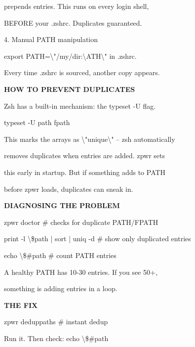 \documentclass[11pt,a4paper,twoside]{book}
\begin{document}
prepends entries. This runs on every login shell,

BEFORE your .zshrc. Duplicates guaranteed.

4. Manual PATH manipulation

export PATH=\textbackslash{}"/my/dir:\textbackslash{}ATH\textbackslash{}" in .zshrc.

Every time .zshrc is sourced, another copy appears.


\vspace{12pt}
{\bfseries\color{neonyellow} HOW TO PREVENT DUPLICATES}\vspace{4pt}

Zsh has a built-in mechanism: the typeset -U flag.

typeset -U path fpath

This marks the arrays as \textbackslash{}"unique\textbackslash{}" -- zsh automatically

removes duplicates when entries are added. zpwr sets

this early in startup. But if something adds to PATH

before zpwr loads, duplicates can sneak in.


\vspace{12pt}
{\bfseries\color{neonyellow} DIAGNOSING THE PROBLEM}\vspace{4pt}

\begin{codebox}
zpwr doctor                         \# checks for duplicate PATH/FPATH\\
\end{codebox}

print -l \textbackslash{}\$path | sort | uniq -d     \# show only duplicated entries

echo \textbackslash{}\$\#path                         \# count PATH entries

A healthy PATH has 10-30 entries. If you see 50+,

something is adding entries in a loop.


\vspace{12pt}
{\bfseries\color{neonyellow} THE FIX}\vspace{4pt}

\begin{codebox}
zpwr deduppaths                     \# instant dedup\\
\end{codebox}

Run it. Then check: echo \textbackslash{}\$\#path
\end{document}
